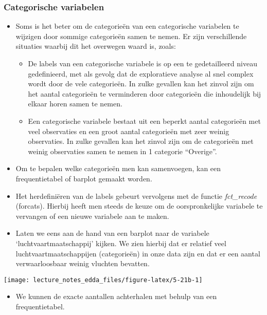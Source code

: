 \documentclass[]{memoir}
\providecommand{\tightlist}{%
  \setlength{\itemsep}{0pt}\setlength{\parskip}{0pt}}
\begin{document}
\subsubsection{Categorische variabelen}\label{categorische-variabelen}

\begin{itemize}
\tightlist
\item
  Soms is het beter om de categorieën van een categorische variabelen te
  wijzigen door sommige categorieën samen te nemen. Er zijn
  verschillende situaties waarbij dit het overwegen waard is, zoals:

  \begin{itemize}
  \tightlist
  \item
    De labels van een categorische variabele is op een te gedetailleerd
    niveau gedefinieerd, met als gevolg dat de exploratieve analyse al
    snel complex wordt door de vele categorieën. In zulke gevallen kan
    het zinvol zijn om het aantal categorieën te verminderen door
    categorieën die inhoudelijk bij elkaar horen samen te nemen.
  \item
    Een categorische variabele bestaat uit een beperkt aantal
    categorieën met veel observaties en een groot aantal categorieën met
    zeer weinig observaties. In zulke gevallen kan het zinvol zijn om de
    categorieën met weinig observaties samen te nemen in 1 categorie
    ``Overige''.
  \end{itemize}
\item
  Om te bepalen welke categorieën men kan samenvoegen, kan een
  frequentietabel of barplot gemaakt worden.
\item
  Het herdefiniëren van de labels gebeurt vervolgens met de functie
  \emph{fct\_recode} (forcats). Hierbij heeft men steeds de keuze om de
  oorspronkelijke variabele te vervangen of een nieuwe variabele aan te
  maken.
\item
  Laten we eens aan de hand van een barplot naar de variabele
  `luchtvaartmaatschappij' kijken. We zien hierbij dat er relatief veel
  luchtvaartmaatschappijen (categorieën) in onze data zijn en dat er een
  aantal verwaarloosbaar weinig vluchten bevatten.
\end{itemize}

\texttt{[image: lecture\_notes\_edda\_files/figure-latex/5-21b-1]}

\begin{itemize}
\tightlist
\item
  We kunnen de exacte aantallen achterhalen met behulp van een
  frequentietabel.
\end{itemize}
\end{document}
